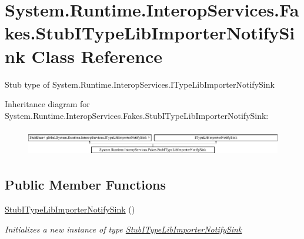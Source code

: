 \hypertarget{class_system_1_1_runtime_1_1_interop_services_1_1_fakes_1_1_stub_i_type_lib_importer_notify_sink}{\section{System.\-Runtime.\-Interop\-Services.\-Fakes.\-Stub\-I\-Type\-Lib\-Importer\-Notify\-Sink Class Reference}
\label{class_system_1_1_runtime_1_1_interop_services_1_1_fakes_1_1_stub_i_type_lib_importer_notify_sink}
}


Stub type of System.\-Runtime.\-Interop\-Services.\-I\-Type\-Lib\-Importer\-Notify\-Sink 


Inheritance diagram for System.\-Runtime.\-Interop\-Services.\-Fakes.\-Stub\-I\-Type\-Lib\-Importer\-Notify\-Sink\-:\begin{figure}[H]
\begin{center}
\leavevmode
\includegraphics[height=1.188960cm]{class_system_1_1_runtime_1_1_interop_services_1_1_fakes_1_1_stub_i_type_lib_importer_notify_sink}
\end{center}
\end{figure}
\subsection*{Public Member Functions}
\begin{DoxyCompactItemize}
\item 
\hyperlink{class_system_1_1_runtime_1_1_interop_services_1_1_fakes_1_1_stub_i_type_lib_importer_notify_sink_a822b19161791e1bbf8a89c18212af222}{Stub\-I\-Type\-Lib\-Importer\-Notify\-Sink} ()
\begin{DoxyCompactList}\small\item\em Initializes a new instance of type \hyperlink{class_system_1_1_runtime_1_1_interop_services_1_1_fakes_1_1_stub_i_type_lib_importer_notify_sink}{Stub\-I\-Type\-Lib\-Importer\-Notify\-Sink}\end{DoxyCompactList}\end{DoxyCompactItemize}
